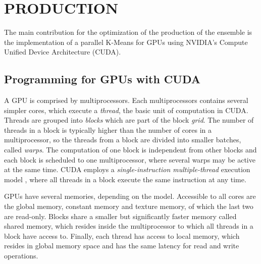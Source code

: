 \section{\uppercase{Production}}
\label{sec:production}

The main contribution for the optimization of the production of the ensemble is the implementation of a parallel K-Means for GPUs using NVIDIA's Compute Unified Device Architecture (CUDA).




\subsection{Programming for GPUs with CUDA}

A GPU is comprised by multiprocessors.
Each multiprocessors contains several simpler cores, which execute a \emph{thread}, the basic unit of computation in CUDA.
Threads are grouped into \emph{blocks} which are part of the block \emph{grid}.
The number of threads in a block is typically higher than the number of cores in a multiprocessor, so the threads from a block are divided into smaller batches, called \emph{warps}.
The computation of one block is independent from other blocks and each block is scheduled to one multiprocessor, where several warps may be active at the same time.
CUDA employs a \emph{single-instruction multiple-thread} execution model \cite{lindholm2008nvidia}, where all threads in a block execute the same instruction at any time. %

GPUs have several memories, depending on the model.
Accessible to all cores are the global memory, constant memory and texture memory, of which the last two are read-only.
Blocks share a smaller but significantly faster memory called shared memory, which resides inside the multiprocessor to which all threads in a block have access to.
Finally, each thread has access to local memory, which resides in global memory space and has the same latency for read and write operations.

